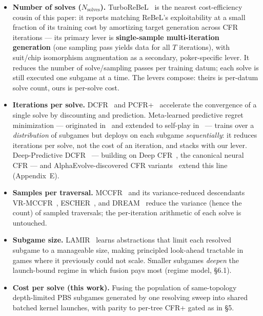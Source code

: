 \documentclass[11pt]{article}
\begin{document}
\begin{itemize}
\item \textbf{Number of solves ($N_{\text{solves}}$).} TurboReBeL~\citep{TurboReBeL} is
the nearest cost-efficiency cousin of this paper: it reports matching ReBeL's
exploitability at a small fraction of its training cost by amortizing target generation
across CFR iterations --- its primary lever is \textbf{single-sample multi-iteration
generation} (one sampling pass yields data for all $T$ iterations), with suit/chip
isomorphism augmentation as a secondary, poker-specific lever. It reduces the number of
solve/sampling passes per training datum; each solve is still executed one subgame at a
time. The levers compose: theirs is per-datum solve count, ours is per-solve cost.
\item \textbf{Iterations per solve.} DCFR~\citep{BrownSandholm2019} and
PCFR+~\citep{Farina2021} accelerate the convergence of a single solve by discounting and
prediction. Meta-learned predictive regret minimization --- originated
in~\citep{Sychrovsky2024} and extended to self-play in~\citep{NPCFR} --- trains over a
\emph{distribution} of subgames but deploys on each subgame \emph{sequentially}: it
reduces iterations per solve, not the cost of an iteration, and stacks with our lever.
Deep-Predictive DCFR~\citep{DeepPredictiveDCFR} --- building on Deep
CFR~\citep{Brown2019DeepCFR}, the canonical neural CFR --- and AlphaEvolve-discovered
CFR variants~\citep{AlphaEvolve-CFR} extend this line (Appendix~E).
\item \textbf{Samples per traversal.} MCCFR~\citep{Lanctot2009} and its
variance-reduced descendants VR-MCCFR~\citep{Schmid2019}, ESCHER~\citep{McAleer2023},
and DREAM~\citep{Steinberger2020} reduce the variance (hence the count) of sampled
traversals; the per-iteration arithmetic of each solve is untouched.
\item \textbf{Subgame size.} LAMIR~\citep{LAMIR} learns abstractions that limit each
resolved subgame to a manageable size, making principled look-ahead tractable in games
where it previously could not scale. Smaller subgames \emph{deepen} the launch-bound
regime in which fusion pays most (regime model, \S6.1).
\item \textbf{Cost per solve (this work).} Fusing the population of same-topology
depth-limited PBS subgames generated by one resolving sweep into shared batched kernel
launches, with parity to per-tree CFR+ gated as in \S5.
\end{itemize}
\end{document}
